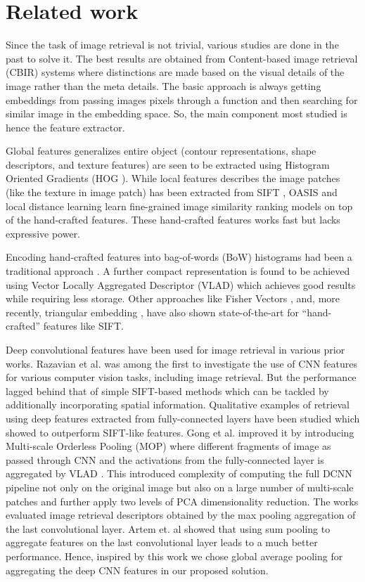 \documentclass[10pt,twocolumn,letterpaper]{article}
\begin{document}
\vspace{-2mm}
\section{Related work}
\vspace{-1mm}
Since the task of image retrieval is not trivial, various studies are done in the past to solve it. The best results are obtained from Content-based image retrieval (CBIR) systems where distinctions are made based on the visual details of the image rather than the meta details. The basic approach is always getting embeddings from passing images pixels through a function and then searching for similar image in the embedding space. So, the main component most studied is hence the feature extractor.

Global features generalizes entire object (contour representations, shape descriptors, and texture features) are seen to be extracted using Histogram Oriented Gradients (HOG \cite{c11}). While local features describes the image patches (like the texture in image patch) has been extracted from SIFT \cite{c12}, OASIS \cite{c13} and local distance learning \cite{c14} learn fine-grained image similarity ranking models on top of the hand-crafted features. These hand-crafted features works fast but lacks expressive power.

Encoding hand-crafted features into bag-of-words (BoW) histograms had been a traditional approach \cite{c15}. A further compact representation is found to be achieved using Vector Locally Aggregated Descriptor (VLAD) \cite{c16} which achieves good results while requiring less storage. Other approaches like Fisher Vectors \cite{c18}, and, more recently, triangular embedding \cite{c19}, have also shown state-of-the-art for “hand-crafted” features like SIFT. 

Deep convolutional features have been used for image retrieval in various prior works. Razavian et al. \cite{c17} was among the first to investigate the use of CNN features for various computer vision tasks, including image retrieval. But the performance lagged behind that of simple SIFT-based methods which can be tackled by additionally incorporating spatial information. Qualitative examples of retrieval using deep features extracted from fully-connected layers have been studied \cite{c15, c20} which showed to outperform SIFT-like features. Gong et al. \cite{c21} improved it by introducing Multi-scale Orderless Pooling (MOP) where different fragments of image as passed through CNN and the activations from the fully-connected layer is aggregated by VLAD \cite{c16}. This introduced complexity of computing the full DCNN pipeline not only on the original image but also on a large number of multi-scale patches and further apply two levels of PCA dimensionality reduction. The works \cite{c22, c23} evaluated image retrieval descriptors obtained by the max pooling aggregation of the last convolutional layer. Artem et. al \cite{c10} showed that using sum pooling to aggregate features on the last convolutional layer leads to a much better performance. Hence, inspired by this work we chose global average pooling for aggregating the deep CNN features in our proposed solution.
\end{document}
